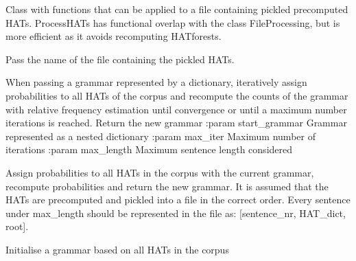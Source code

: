 \documentclass[letterpaper,10pt,english]{sphinxmanual}
\begin{document}
\begin{fulllineitems}
\label{process_hats:process_hats.ProcessHATs}
Class with functions that can be applied to a file
containing pickled precomputed HATs.
ProcessHATs has functional overlap with the class
FileProcessing, but is more efficient as it avoids
recomputing HATforests.

Pass the name of the file containing the pickled
HATs.

\begin{fulllineitems}
\label{process_hats:process_hats.ProcessHATs.em}
When passing a grammar represented by a dictionary,
iteratively assign probabilities to all HATs of the
corpus and recompute the counts of the grammar with
relative frequency estimation until convergence or
until a maximum number iterations is reached.
Return the new grammar
:param start\_grammar    Grammar represented as a nested dictionary
:param max\_iter                 Maximum number of iterations
:param max\_length               Maximum sentence length considered

\end{fulllineitems}


\begin{fulllineitems}
\label{process_hats:process_hats.ProcessHATs.em_iteration}
Assign probabilities to all HATs in the corpus with the
current grammar, recompute probabilities and return the
new grammar.
It is assumed that the HATs are precomputed and pickled into
a file in the correct order. Every sentence under max\_length should
be represented in the file as: {[}sentence\_nr, HAT\_dict, root{]}.

\end{fulllineitems}


\begin{fulllineitems}
\label{process_hats:process_hats.ProcessHATs.initialise_grammar}
Initialise a grammar based on all HATs in the corpus


\end{fulllineitems}
\end{fulllineitems}
\end{document}

